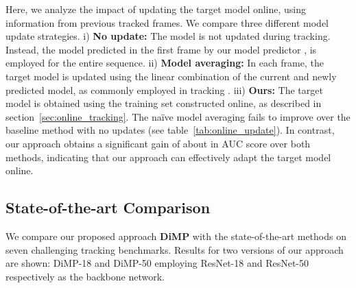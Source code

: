 \documentclass[10pt,twocolumn,letterpaper]{article}
\begin{document}
\begin{table}[!t]
	\centering\vspace{-1mm}
	\vspace{1mm}\caption{Comparison of different model update strategies on the combined OTB-100, NFS and UAV123 datasets.
	}
	\label{tab:online_update}\vspace{-1mm}
\end{table}

Here, we analyze the impact of updating the target model online, using information from previous tracked frames.
We compare three different model update strategies. i) \textbf{No update:} The model is not updated during tracking. Instead, the model predicted in the first frame by our model predictor , is employed for the entire sequence. ii) \textbf{Model averaging:} In each frame, the target model is updated using the linear combination of the current and newly predicted model, as commonly employed in tracking \cite{Henriques14,BACFgaloogahi,Valmadre2017cvpr}. iii) \textbf{Ours:} The target model is obtained using the training set constructed online, as described in section~\ref{sec:online_tracking}. The na\"ive model averaging fails to improve over the baseline method with no updates (see table~\ref{tab:online_update}). In contrast, our approach obtains a significant gain of about  in AUC score over both methods, indicating that our approach can effectively adapt the target model online.
\subsection{State-of-the-art Comparison}
We compare our proposed approach \textbf{DiMP} with the state-of-the-art methods on seven challenging tracking benchmarks. Results for two versions of our approach are shown: DiMP-18 and DiMP-50 employing ResNet-18 and ResNet-50 respectively as the backbone network.
\end{document}
